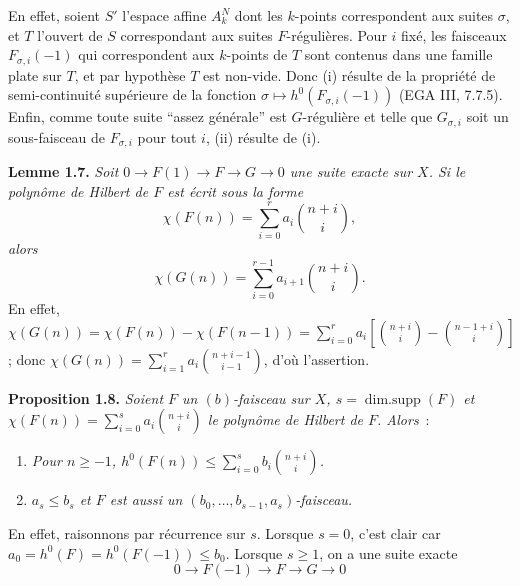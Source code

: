 En
effet, soient \(S'\) l'espace affine \(A_k^N\) dont les \(k\)-points correspondent aux suites \(\sigma\), et \(T\) l'ouvert de \(S\) correspondant aux suites \(F\)-régulières. Pour \(i\) fixé, les faisceaux \(F_{\sigma,i}(-1)\) qui correspondent aux \(k\)-points de \(T\) sont contenus dans une famille plate sur \(T\), et par hypothèse \(T\) est non-vide. Donc (i) résulte de la propriété de semi-continuité supérieure de la fonction $\sigma\longmapsto h^0(F_{\sigma,i}(-1))$ (EGA III, 7.7.5). Enfin, comme toute suite ``assez générale'' est \(G\)-régulière et telle que \(G_{\sigma,i}\) soit un sous-faisceau de \(F_{\sigma,i}\) pour tout \(i\), (ii) résulte de (i).

\textbf{Lemme 1.7.} \emph{Soit \(0\to F(1)\to F\to G\to0\) une suite exacte sur \(X\). Si le polynôme de Hilbert de \(F\) est écrit sous la forme}
\[
 \chi(F(n))=\sum_{i=0}^{r}a_i\binom{n+i}{i},
\]
\emph{alors}
\[
 \chi(G(n))=\sum_{i=0}^{r-1}a_{i+1}\binom{n+i}{i}.
\]
En effet, \(\chi(G(n))=\chi(F(n))-\chi(F(n-1))=\sum_{i=0}^{r}a_i\left[\binom{n+i}{i}-\binom{n-1+i}{i}\right]\); donc \(\chi(G(n))=\sum_{i=1}^{r}a_i\binom{n+i-1}{i-1}\), d'où l'assertion.

\textbf{Proposition 1.8.} \emph{Soient \(F\) un \((b)\)-faisceau sur \(X\), \(s=\operatorname{dim{.}supp}(F)\) et \(\chi(F(n))=\sum_{i=0}^{s}a_i\binom{n+i}{i}\) le polynôme de Hilbert de \(F\). Alors}~:
\begin{enumerate}[label=(\roman*)]
\item \emph{Pour \(n\ge -1\), \(h^0(F(n))\le \sum_{i=0}^{s}b_i\binom{n+i}{i}\).}
\item \emph{\(a_s\le b_s\) et \(F\) est aussi un \((b_0,\ldots,b_{s-1},a_s)\)-faisceau.}
\end{enumerate}
En effet, raisonnons par récurrence sur \(s\). Lorsque \(s=0\), c'est clair car \(a_0=h^0(F)=h^0(F(-1))\le b_0\). Lorsque \(s\ge1\), on a une suite exacte
\[
0\longrightarrow F(-1)\longrightarrow F\longrightarrow G\longrightarrow0
\]
